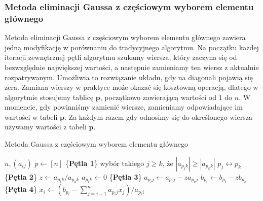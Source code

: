 \documentclass[12pt]{article}
\begin{document}
\subsubsection*{Metoda eliminacji Gaussa z częściowym wyborem elementu głównego}
Metoda eliminacji Gaussa z częściowym wyborem elementu głównego zawiera jedną modyfikację w porównaniu do tradycyjnego algorytmu. Na początku każdej iteracji zewnętrznej pętli algorytmu szukamy wiersza, który zaczyna się od bezwzględnie największej wartości, a następnie zamieniamy ten wiersz z aktualnie rozpatrywanym. Umożliwia to rozwiązanie układu, gdy na diagonali pojawią się zera. Zamiana wierszy w praktyce może okazać się kosztowną operacją, dlatego w algorytmie stosujemy tablicę $\textbf{p}$, początkowo zawierającą wartości od $1$ do $n$. W momencie, gdy powinniśmy zamienić wiersze, zamieniamy odpowiadające im wartości w tabeli $\textbf{p}$. Za każdym razem gdy odnosimy się do określonego wiersza używamy wartości z tabeli $\textbf{p}$.

\begin{algorithm} %
\caption{Metoda Gaussa z częściowym wyborem elementu głównego}
\label{alg2} %
\begin{algorithmic} %
    \REQUIRE $n, (a_{ij})$
    \STATE $p \leftarrow [n]$
    \STATE \{\textbf{Pętla 1}\}
		\STATE wybór takiego $j \geq k$, że $|a_{p_jk}| \geq |a_{p_kk}|$
		\STATE $p_j \leftrightarrow p_k$
    		\STATE \{\textbf{Pętla 2}\}
		\STATE $z \leftarrow a_{p_ik}/a_{p_kk}$
		\STATE $a_{p_ik} \leftarrow 0$
    			\STATE \{\textbf{Pętla 3}\}
				\STATE $a_{p_ij} \leftarrow a_{p_ij} - z a_{p_kj}$
    			\ENDFOR
    			\STATE $b_{p_i} \leftarrow b_{p_i} - z b_{p_k}$
    		\ENDFOR
    \ENDFOR
    \STATE \{\textbf{Pętla 4}\}
		\STATE $x_i \leftarrow (b_{p_i} - \sum^n_{j=i+1}a_{p_ij}x_j)/a_{p_ii}$
    \ENDFOR
\end{algorithmic}
\end{algorithm}
\end{document}
